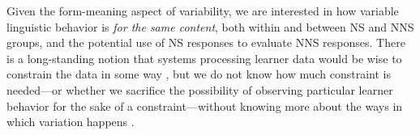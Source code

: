 \documentclass[11pt,a4paper]{article}
\begin{document}
Given the form-meaning aspect of variability, we are interested in how variable linguistic behavior is \emph{for the same content}, both within and between NS and NNS groups, and the potential use of NS responses to evaluate NNS responses.  There is a long-standing notion that systems processing learner data would be wise to constrain the data in some way \citep[e.g.,][]{heift:schulze:07, somasundaran:ea:15}, but we do not know how much constraint is needed---or whether we sacrifice the possibility of observing particular learner behavior for the sake of a constraint---without knowing more about the ways in which variation happens \citep[cf.][]{bailey:meurers:08}.  

%
%
%
%
%
%
\end{document}
